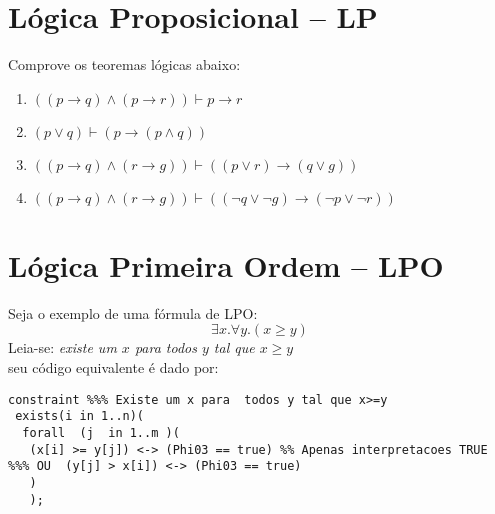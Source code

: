 \documentclass[paper=a4, fontsize=11pt]{scrartcl} %
\numberwithin{equation}{section} %
\numberwithin{figure}{section} %
\numberwithin{table}{section} %
\begin{document}



\newpage
\section{Lógica Proposicional -- LP}

Comprove os teoremas lógicas abaixo:

\begin{enumerate}


\item $((p \to q )\land (p \to r))\vdash p \to r$


\item $(p \lor q)\vdash( p \to ( p \land q))$

\item $((p \to q) \land (r \to g)) \vdash((p \lor r) \to ( q \lor g))$

\item $((p \to q) \land (r \to g)) \vdash((\lnot q \lor \lnot g) \to(\lnot p \lor \lnot r))$

\end{enumerate}


\newpage
\section{Lógica Primeira Ordem -- LPO}

Seja o exemplo de uma fórmula de LPO:\\
$$\exists x . \forall y .(x \ge y)$$
Leia-se: \textit{existe um $x$ para  todos $y$ tal que $x \ge y$}\\
seu código equivalente é dado por:
\begin{small}
\begin{verbatim}
constraint %%% Existe um x para  todos y tal que x>=y 
 exists(i in 1..n)(
  forall  (j  in 1..m )( 
   (x[i] >= y[j]) <-> (Phi03 == true) %% Apenas interpretacoes TRUE
%%% OU  (y[j] > x[i]) <-> (Phi03 == true)
   ) 
   );
\end{verbatim}
\end{small}
\end{document}
